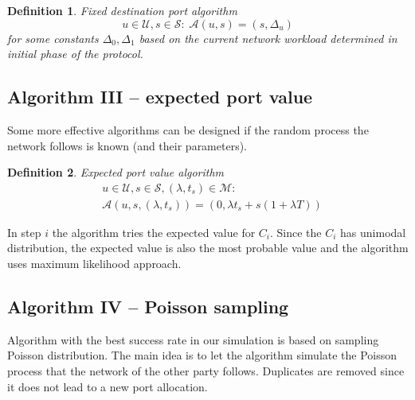 \documentclass{llncs}
\newtheorem{mydef}{Definition}
\begin{document}
\begin{mydef}
Fixed destination port algorithm
\[
u \in \mathcal{U}, s \in \mathcal{S}: \;
\mathcal{A}(u, s) = (s, \Delta_u)
\] for some constants $\Delta_0, \Delta_1$ based on the current network workload determined in initial phase of the protocol.
\end{mydef}

\subsection{Algorithm III -- expected port value}
Some more effective algorithms can be designed if the random process the network follows is known (and their
parameters).

\begin{mydef}
Expected port value algorithm
\begin{align*}
& u \in \mathcal{U}, s \in \mathcal{S}, (\lambda, t_s) \in \mathcal{M}:\\
& \mathcal{A}(u, s, (\lambda, t_s)) = (0, \lambda t_s + s(1 + \lambda T))
\end{align*}
\end{mydef}

In step $i$ the algorithm tries the expected value for $C_i$. Since the $C_i$ has unimodal distribution,
the expected value is also the most probable value and the algorithm uses maximum likelihood approach.
\newpage
\subsection{Algorithm IV -- Poisson sampling}
Algorithm with the best success rate in our simulation is based on sampling Poisson distribution.
The main idea is to let the algorithm simulate the Poisson process that the network of the
other party follows. Duplicates are removed since it does not lead to a new port allocation.
\end{document}
